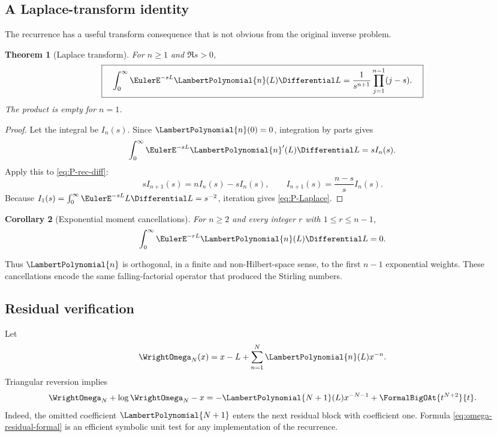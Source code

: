 \documentclass[11pt]{article}
\theoremstyle{pltheorem}
\newtheorem{theorem}{Theorem}[section]
\newtheorem{corollary}[theorem]{Corollary}
\begin{document}
\subsection{A Laplace-transform identity}

The recurrence has a useful transform consequence that is not obvious from the original inverse problem.

\begin{theorem}[Laplace transform]\label{thm:P-Laplace}
For \(n\ge1\) and \(\Re s>0\),
\begin{equation}\label{eq:P-Laplace}
 \boxed{\quad
 \int_0^\infty\EulerE^{-sL}\LambertPolynomial{n}(L)\Differential L
 =\frac{1}{s^{n+1}}\prod_{j=1}^{n-1}(j-s).
 \quad}
\end{equation}
The product is empty for \(n=1\).
\end{theorem}

\begin{proof}
Let the integral be \(I_n(s)\).  Since \(\LambertPolynomial{n}(0)=0\), integration by parts gives
\[
 \int_0^\infty\EulerE^{-sL}{\LambertPolynomial{n}}'(L)\Differential L=sI_n(s).
\]
Apply this to \cref{eq:P-rec-diff}:
\[
 sI_{n+1}(s)=nI_n(s)-sI_n(s),
 \qquad
 I_{n+1}(s)=\frac{n-s}{s}I_n(s).
\]
Because \(I_1(s)=\int_0^\infty\EulerE^{-sL}L\Differential L=s^{-2}\), iteration gives
\cref{eq:P-Laplace}.
\end{proof}

\begin{corollary}[Exponential moment cancellations]\label{cor:P-moment-zero}
For \(n\ge2\) and every integer \(r\) with \(1\le r\le n-1\),
\begin{equation}\label{eq:P-moment-zero}
 \int_0^\infty\EulerE^{-rL}\LambertPolynomial{n}(L)\Differential L=0.
\end{equation}
\end{corollary}

Thus \(\LambertPolynomial{n}\) is orthogonal, in a finite and non-Hilbert-space sense, to the first \(n-1\) exponential weights.  These cancellations encode the same falling-factorial operator that produced the Stirling numbers.

\subsection{Residual verification}

Let
\begin{equation}\label{eq:omega-trunc}
 \WrightOmega_N(x)=x-L+\sum_{n=1}^{N}\LambertPolynomial{n}(L)x^{-n}.
\end{equation}
Triangular reversion implies
\begin{equation}\label{eq:omega-residual-formal}
 \WrightOmega_N+\log\WrightOmega_N-x
 =-\LambertPolynomial{N+1}(L)x^{-N-1}+\FormalBigOAt{t^{N+2}}{t}.
\end{equation}
Indeed, the omitted coefficient \(\LambertPolynomial{N+1}\) enters the next residual block with coefficient one.  Formula \cref{eq:omega-residual-formal} is an efficient symbolic unit test for any implementation of the recurrence.
\end{document}
